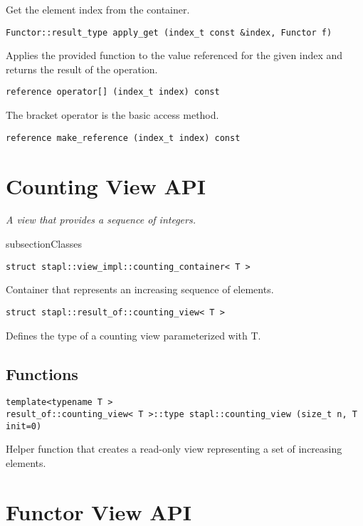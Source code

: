 Get the element index from the container.

\begin{verbatim}
Functor::result_type apply_get (index_t const &index, Functor f)
\end{verbatim}

Applies the provided function to the value referenced for the given index and returns the result of the operation.

\begin{verbatim}
reference operator[] (index_t index) const
\end{verbatim}

The bracket operator is the basic access method.

\begin{verbatim}
reference make_reference (index_t index) const
\end{verbatim}

\section{Counting View API} \label{sec-cnt-vw}

\emph{ A view that provides a sequence of integers.}

subsection{Classes}

\begin{verbatim}
struct stapl::view_impl::counting_container< T >
\end{verbatim}

Container that represents an increasing sequence of elements.

\begin{verbatim}
struct stapl::result_of::counting_view< T >
\end{verbatim}

Defines the type of a counting view parameterized with T.

\subsection{Functions}

\begin{verbatim}
template<typename T >
result_of::counting_view< T >::type stapl::counting_view (size_t n, T init=0)
\end{verbatim}

Helper function that creates a read-only view representing a set of increasing elements.

\section{Functor View API} \label{sec-func-vw}

